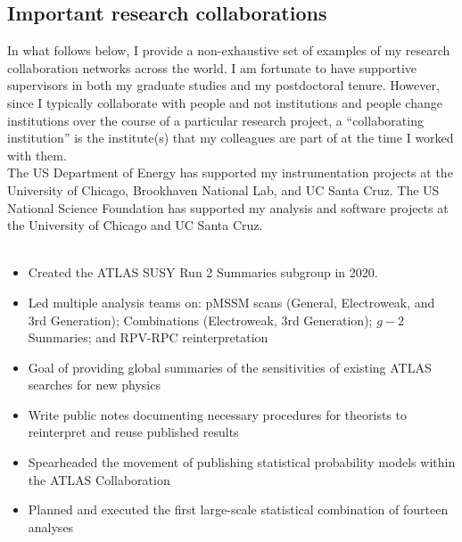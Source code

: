\subsection{Important research collaborations}\label{ssec:important-research-collaborations}
In what follows below, I provide a non-exhaustive set of examples of my research collaboration networks across the world.
I am fortunate to have supportive supervisors in both my graduate studies and my postdoctoral tenure.
However, since I typically collaborate with people and not institutions and people change institutions over the course of a particular research project, a \enquote{collaborating institution} is the institute(s) that my colleagues are part of at the time I worked with them.\\

 The US Department of Energy has supported my instrumentation projects at the University of Chicago, Brookhaven National Lab, and UC Santa Cruz. The US National Science Foundation has supported my analysis and software projects at the University of Chicago and UC Santa Cruz.\\

\\


\begin{itemize}
	\item Created the ATLAS SUSY Run 2 Summaries subgroup in 2020.
	\item Led multiple analysis teams on: pMSSM scans (General, Electroweak, and 3rd Generation); Combinations (Electroweak, 3rd Generation); $g-2$ Summaries; and RPV-RPC reinterpretation
	\item Goal of providing global summaries of the sensitivities of existing ATLAS searches for new physics
	\item Write public notes documenting necessary procedures for theorists to reinterpret and reuse published results
	\item Spearheaded the movement of publishing statistical probability models within the ATLAS Collaboration
	\item Planned and executed the first large-scale statistical combination of fourteen analyses
\end{itemize}

